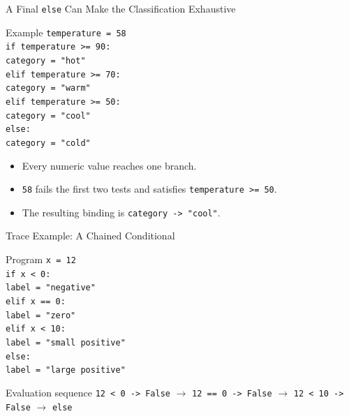 \documentclass[aspectratio=169,10pt]{beamer}
\begin{document}
\begin{frame}{A Final \texttt{else} Can Make the Classification Exhaustive}
  \begin{block}{Example}
    \texttt{temperature = 58}\\[0.06in]
    \texttt{if temperature >= 90:}\\
    \hspace*{0.20in}\texttt{category = "hot"}\\
    \texttt{elif temperature >= 70:}\\
    \hspace*{0.20in}\texttt{category = "warm"}\\
    \texttt{elif temperature >= 50:}\\
    \hspace*{0.20in}\texttt{category = "cool"}\\
    \texttt{else:}\\
    \hspace*{0.20in}\texttt{category = "cold"}
  \end{block}

  \begin{itemize}
    \item Every numeric value reaches one branch.
    \item \texttt{58} fails the first two tests and satisfies \texttt{temperature >= 50}.
    \item The resulting binding is \texttt{category -> "cool"}.
  \end{itemize}
\end{frame}

\begin{frame}{Trace Example: A Chained Conditional}
  \begin{block}{Program}
    \texttt{x = 12}\\
    \texttt{if x < 0:}\\
    \hspace*{0.20in}\texttt{label = "negative"}\\
    \texttt{elif x == 0:}\\
    \hspace*{0.20in}\texttt{label = "zero"}\\
    \texttt{elif x < 10:}\\
    \hspace*{0.20in}\texttt{label = "small positive"}\\
    \texttt{else:}\\
    \hspace*{0.20in}\texttt{label = "large positive"}
  \end{block}

  \begin{block}{Evaluation sequence}
    \texttt{12 < 0 -> False} $\rightarrow$
    \texttt{12 == 0 -> False} $\rightarrow$
    \texttt{12 < 10 -> False} $\rightarrow$
    \texttt{else}
  \end{block}
\end{frame}
\end{document}
